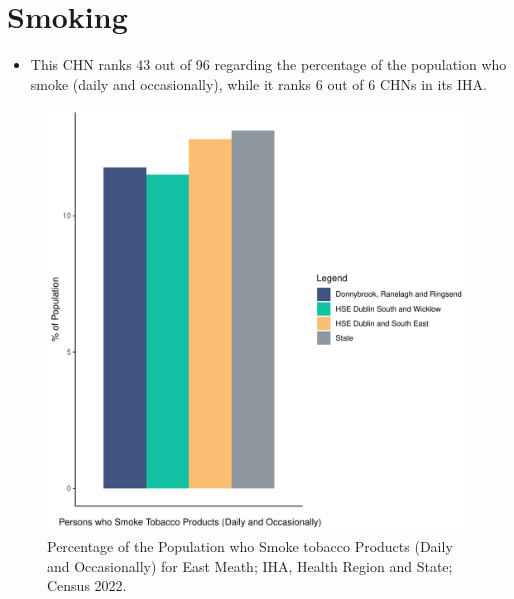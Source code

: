 \documentclass{article}
\begin{document}
\pagebreak

\section{Smoking}\label{sect:Smoking}
\begin{itemize}
\item This CHN ranks  43 out of 96 regarding the percentage of the population who smoke (daily and occasionally), while it ranks   6 out of 6 CHNs in its IHA.
\end{itemize}
\begin{figure}[H]
	\centering
	\includegraphics[width = 120mm]{../figures/SmokingED.pdf}
	\caption{Percentage of the Population who Smoke tobacco Products (Daily and Occasionally) for East Meath; IHA, Health Region and State; Census 2022.}
	\label{fig:2ae19629-1a6a-13a3-e055-000000000001}
	\end{figure}
	
\end{document}
